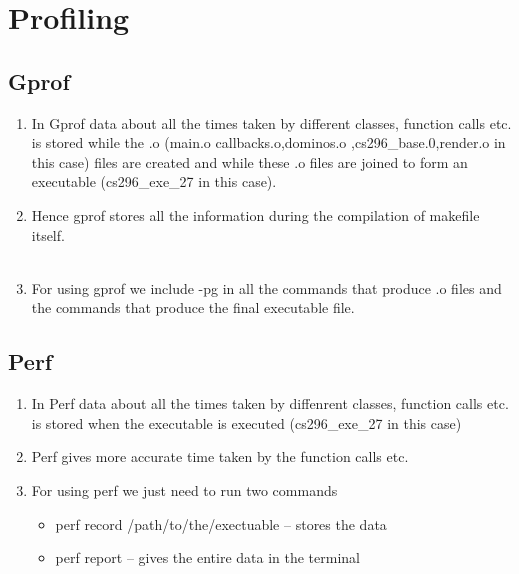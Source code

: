 \documentclass{article}
\begin{document}
\section{Profiling}
\subsection{Gprof}
\begin{enumerate}
\item In Gprof data about all the times taken by different classes, function calls etc. is stored while the .o (main.o callbacks.o,dominos.o
,cs296\_base.0,render.o in this case) files are created and while these .o files are joined to form an executable (cs296\_exe\_27 in this case).\\
\item Hence gprof stores all the information during the compilation of makefile itself.\\ \\
\item For using gprof we include -pg in all the commands that produce .o files and the commands that produce the 
final executable file.
\end{enumerate}

\subsection{Perf}
\begin{enumerate}
\item In Perf data about all the times taken by diffenrent classes, function calls etc. is stored when the executable is executed (cs296\_exe\_27 in this case) \\
\item Perf gives more accurate time taken by the function calls etc. \\
\item For using perf we just need to run two commands \\
\begin{itemize}
\item perf record /path/to/the/exectuable -- stores the data \\
\item perf report -- gives the entire data in the terminal\cite{Shivam}
\end{itemize}
\end{enumerate}
\end{document}
